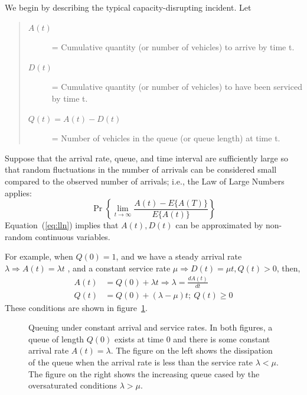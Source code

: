 \documentclass[12pt]{report}
\newcommand{\inputTikZ}[1]{%
    \begin{singlespace}
    \end{singlespace}
  }
\newcommand{\inputTikZ}[1]{%
    \begin{singlespace}
    \beginpgfgraphicnamed{#1-external}%
    \endpgfgraphicnamed%
    \end{singlespace}
  }
\newcounter{time}
\newcounter{space}
\begin{document}
We begin by describing the typical capacity-disrupting incident. Let
\begin{quote}
\begin{description}
\item[$A(t)$] = Cumulative quantity (or number of vehicles) to arrive
  by time t.
\item[$D(t)$] = Cumulative quantity (or number of vehicles) to have
  been serviced by time t.
\item[$Q(t)=A(t)-D(t)$] = Number of vehicles in the queue (or queue
  length) at time t.
\end{description}
\end{quote}
Suppose that the arrival rate, queue, and time interval are
sufficiently large so that random fluctuations in the number of
arrivals can be considered small compared to the observed number of
arrivals; i.e., the Law of Large Numbers applies:
\begin{equation}
  \label{eq:lln}
  \Pr\left\{\lim_{t\to\infty}\frac{A(t)-E\{A(T)\}}{E\{A(t)\}}\right\} 
\end{equation}
Equation~(\ref{eq:lln}) implies that $A(t), D(t)$ can be approximated by
non-random continuous variables.

For example, when $Q(0)=1$, and we have a steady arrival rate $\lambda
\Rightarrow A(t) = \lambda t$ , and a constant service rate $\mu \Rightarrow D(t)
= \mu t, Q(t)>0$, then, 
\begin{align*}
  \label{eq:arrival-and-queues}
  A(t) & = Q(0) + \lambda t \Rightarrow \lambda = \frac{dA(t)}{dt}\\
  Q(t) & = Q(0) + (\lambda - \mu ) t; \: Q(t) \ge 0
\end{align*}
These conditions are shown in figure~\ref{fig:queuing-constant-rates}.
\begin{figure}[tbp]
  \begin{center}
    \inputTikZ{figs/queuing-undersat-and-oversat}
    \caption[Queuing under constant arrival and service rates]{Queuing
      under constant arrival and service rates.  In both figures, a
      queue of length $Q(0)$ exists at time 0 and there is some
      constant arrival rate $A(t)=\lambda$.  The figure on the left
      shows the dissipation of the queue when the arrival rate is less
      than the service rate $\lambda<\mu$.  The figure on the right
      shows the increasing queue cased by the oversaturated conditions
      $\lambda>\mu$.}
    \label{fig:queuing-constant-rates}
  \end{center}
\end{figure}
 
\end{document}

